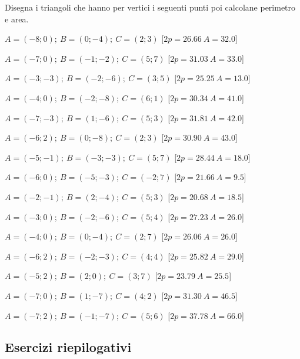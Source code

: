 \begin{esercizio}\label{ese:03.1}
Disegna i triangoli che hanno per vertici i seguenti punti
poi calcolane perimetro e area.
 \begin{enumeratea}
  \item $ A=(-8; 0); ~B=(0; -4); ~C=(2; 3)$ \hfill [$2p=26.66 ~A=32.0$]
  \item $ A=(-7; 0); ~B=(-1; -2); ~C=(5; 7)$ \hfill [$2p=31.03 ~A=33.0$]
  \item $ A=(-3; -3); ~B=(-2; -6); ~C=(3; 5)$ \hfill [$2p=25.25 ~A=13.0$]
  \item $ A=(-4; 0); ~B=(-2; -8); ~C=(6; 1)$ \hfill [$2p=30.34 ~A=41.0$]
  \item $ A=(-7; -3); ~B=(1; -6); ~C=(5; 3)$ \hfill [$2p=31.81 ~A=42.0$]
  \item $ A=(-6; 2); ~B=(0; -8); ~C=(2; 3)$ \hfill [$2p=30.90 ~A=43.0$]
  \item $ A=(-5; -1); ~B=(-3; -3); ~C=(5; 7)$ \hfill [$2p=28.44 ~A=18.0$]
  \item $ A=(-6; 0); ~B=(-5; -3); ~C=(-2; 7)$ \hfill [$2p=21.66 ~A=9.5$]
  \item $ A=(-2; -1); ~B=(2; -4); ~C=(5; 3)$ \hfill [$2p=20.68 ~A=18.5$]
  \item $ A=(-3; 0); ~B=(-2; -6); ~C=(5; 4)$ \hfill [$2p=27.23 ~A=26.0$]
  \item $ A=(-4; 0); ~B=(0; -4); ~C=(2; 7)$ \hfill [$2p=26.06 ~A=26.0$]
  \item $ A=(-6; 2); ~B=(-2; -3); ~C=(4; 4)$ \hfill [$2p=25.82 ~A=29.0$]
  \item $ A=(-5; 2); ~B=(2; 0); ~C=(3; 7)$ \hfill [$2p=23.79 ~A=25.5$]
  \item $ A=(-7; 0); ~B=(1; -7); ~C=(4; 2)$ \hfill [$2p=31.30 ~A=46.5$]
  \item $ A=(-7; 2); ~B=(-1; -7); ~C=(5; 6)$ \hfill [$2p=37.78 ~A=66.0$]
 \end{enumeratea}
\end{esercizio}


\subsection{Esercizi riepilogativi}

